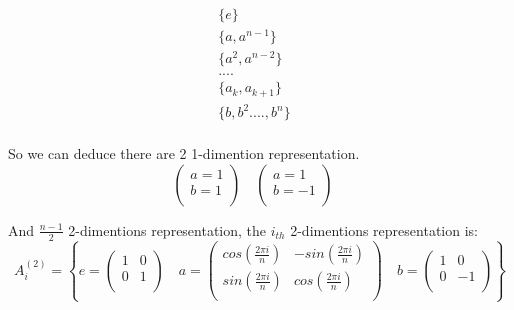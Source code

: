 \documentclass{article}
\begin{document}
\begin{CJK*}{GBK}{song}
\begin{equation}
\begin{aligned}
\{e\}&\\
\{a,a^{n-1}\}&\\
\{a^2,a^{n-2}\}&\\
....\\
\{a_k,a_{k+1}\}&\\
\{b,b^2....,b^{n}\}&\\
\end{aligned}
\end{equation}

So we can deduce there are 2 1-dimention representation.
\begin{equation}
\begin{pmatrix}
     a=1 \\
     b=1 \\
\end{pmatrix}\quad
\begin{pmatrix}
     a=1 \\
     b=-1 \\
\end{pmatrix}\quad
\end{equation}

And $\frac{n-1}{2}$ 2-dimentions representation, the $i_{th}$ 2-dimentions representation is:
\begin{equation}
A_i^{(2)}=\left\{
e=
\begin{pmatrix}
     1  &  0 \\
     0  &  1 \\
\end{pmatrix}\quad
a=
\begin{pmatrix}
     cos(\frac{2\pi i}{n}) & -sin(\frac{2\pi i}{n}) \\
     sin(\frac{2\pi i}{n}) &  cos(\frac{2\pi i}{n}) \\
\end{pmatrix}\quad
b=
\begin{pmatrix}
     1  &  0 \\
     0  & -1 \\
\end{pmatrix}
\right\}
\end{equation}





















\end{CJK*}
\end{document}
